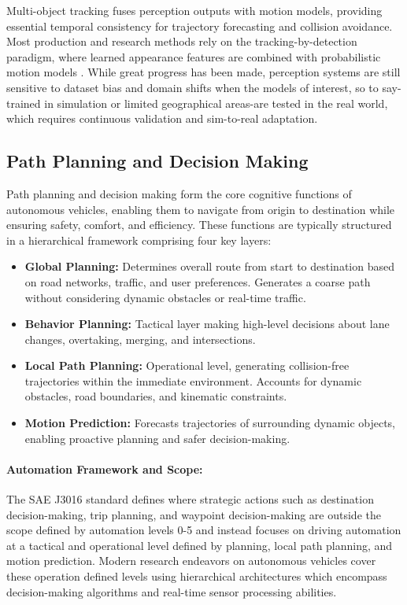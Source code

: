 \documentclass[12pt, a4paper]{report}
\begin{document}
Multi-object tracking fuses perception outputs with motion models, providing essential temporal consistency for trajectory forecasting and collision avoidance. Most production and research methods rely on the tracking-by-detection paradigm, where learned appearance features are combined with probabilistic motion models \cite{ref12}. While great progress has been made, perception systems are still sensitive to dataset bias and domain shifts when the models of interest, so to say-trained in simulation or limited geographical areas-are tested in the real world, which requires continuous validation and sim-to-real adaptation.
\subsection{Path Planning and Decision Making}

Path planning and decision making form the core cognitive functions of autonomous vehicles, enabling them to navigate from origin to destination while ensuring safety, comfort, and efficiency. These functions are typically structured in a hierarchical framework comprising four key layers:

\begin{itemize}
    \item \textbf{Global Planning:} Determines overall route from start to destination based on road networks, traffic, and user preferences. Generates a coarse path without considering dynamic obstacles or real-time traffic.
    \item \textbf{Behavior Planning:} Tactical layer making high-level decisions about lane changes, overtaking, merging, and intersections.
    \item \textbf{Local Path Planning:} Operational level, generating collision-free trajectories within the immediate environment. Accounts for dynamic obstacles, road boundaries, and kinematic constraints.
    \item \textbf{Motion Prediction:} Forecasts trajectories of surrounding dynamic objects, enabling proactive planning and safer decision-making.
\end{itemize}

\paragraph{Automation Framework and Scope:}

The \ac{SAE} J3016 standard defines where strategic actions such as destination decision-making, trip planning, and waypoint decision-making are outside the scope defined by automation levels 0-5 and instead focuses on driving automation at a tactical and operational level defined by planning, local path planning, and motion prediction\cite{ref1}. Modern research endeavors on autonomous vehicles cover these operation defined levels using hierarchical architectures which encompass decision-making algorithms and real-time sensor processing abilities.
\end{document}
